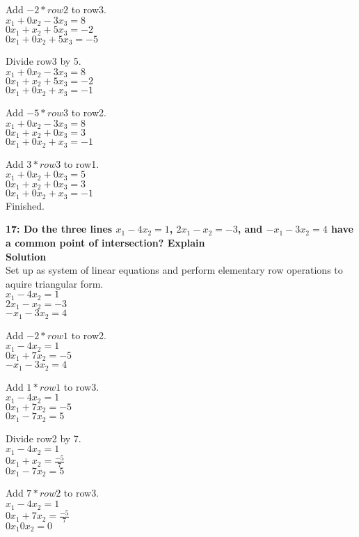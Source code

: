 \documentclass{article}
\begin{document}
Add $-2*row2$ to row3.\\
$x_{1} + 0x_{2} - 3x_{3} = 8$\\
$0x_{1} + x_{2} + 5x_{3} = -2$\\
$0x_{1} + 0x_{2} + 5x_{3} = -5$

Divide row3 by 5.\\
$x_{1} + 0x_{2} - 3x_{3} = 8$\\
$0x_{1} + x_{2} + 5x_{3} = -2$\\
$0x_{1} + 0x_{2} + x_{3} = -1$

Add $-5*row3$ to row2.\\
$x_{1} + 0x_{2} - 3x_{3} = 8$\\
$0x_{1} + x_{2} + 0x_{3} = 3$\\
$0x_{1} + 0x_{2} + x_{3} = -1$

Add $3*row3$ to row1.\\
$x_{1} + 0x_{2} + 0x_{3} = 5$\\
$0x_{1} + x_{2} + 0x_{3} = 3$\\
$0x_{1} + 0x_{2} + x_{3} = -1$
\\Finished.

\textbf{17: Do the three lines $x_{1} - 4x_{2} = 1$, $2x_{1} - x_{2} = -3$, and $-x_{1} - 3x_{2} = 4$ have a common point of intersection? Explain}\\
\textbf{Solution}\\
Set up as system of linear equations and perform elementary row operations to aquire triangular form.\\
$x_{1} - 4x_{2} = 1$\\
$2x_{1} - x_{2} = -3$\\
$-x_{1} - 3x_{2} = 4$

Add $-2*row1$ to row2.\\
$x_{1} - 4x_{2} = 1$\\
$0x_{1} + 7x_{2} = -5$\\
$-x_{1} - 3x_{2} = 4$

Add $1*row1$ to row3.\\
$x_{1} - 4x_{2} = 1$\\
$0x_{1} + 7x_{2} = -5$\\
$0x_{1} -7x_{2} = 5$

Divide row2 by 7.\\
$x_{1} - 4x_{2} = 1$\\
$0x_{1} + x_{2} = \frac{-5}{7}$\\
$0x_{1} -7x_{2} = 5$

Add $7*row2$ to row3.\\
$x_{1} - 4x_{2} = 1$\\
$0x_{1} + 7x_{2} = \frac{-5}{7}$\\
$0x_{1} 0x_{2} = 0$
\end{document}
